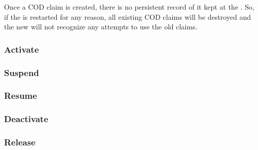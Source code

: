\Note Once a COD claim is created, there is no persistent record of it
kept at the .
So, if the  is restarted for any reason, all existing
COD claims will be destroyed and the new  will not
recognize any attempts to use the old claims.


\subsubsection{\label{sec:cod-claim-activate}Activate}

\Todo


\subsubsection{\label{sec:cod-claim-suspend}Suspend}

\Todo


\subsubsection{\label{sec:cod-claim-resume}Resume}

\Todo



\subsubsection{\label{sec:cod-claim-deactivate}Deactivate}

\Todo


\subsubsection{\label{sec:cod-claim-release}Release}

